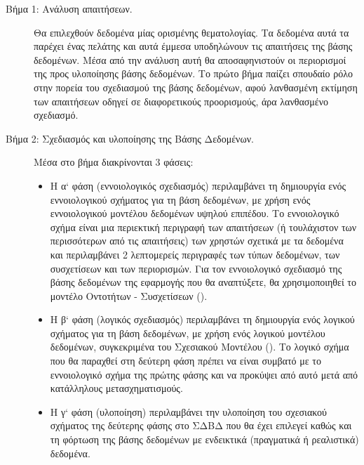 \documentclass{assignment}
\begin{document}
\begin{description}

  \item [Βήμα 1: Ανάλυση απαιτήσεων.]  Θα επιλεχθούν δεδομένα μίας ορισμένης θεματολογίας. Τα δεδομένα αυτά τα παρέχει ένας πελάτης και αυτά έμμεσα υποδηλώνουν τις απαιτήσεις της βάσης δεδομένων. Μέσα από την ανάλυση αυτή θα αποσαφηνιστούν οι περιορισμοί της προς υλοποίησης βάσης δεδομένων. Το πρώτο βήμα παίζει σπουδαίο ρόλο στην πορεία του σχεδιασμού της βάσης δεδομένων, αφού λανθασμένη εκτίμηση των απαιτήσεων οδηγεί σε διαφορετικούς προορισμούς, άρα λανθασμένο σχεδιασμό. 

  \item [Βήμα 2: Σχεδιασμός και υλοποίησης της Βάσης Δεδομένων.] Μέσα στο βήμα διακρίνονται 3 φάσεις:

  \begin{itemize}

    \item Η α` φάση (εννοιολογικός σχεδιασμός) περιλαμβάνει τη δημιουργία ενός εννοιολογικού σχήματος για τη βάση δεδομένων, με χρήση ενός εννοιολογικού μοντέλου δεδομένων υψηλού επιπέδου. Το εννοιολογικό σχήμα είναι μια περιεκτική περιγραφή των απαιτήσεων (ή τουλάχιστον των περισσότερων από τις απαιτήσεις) των χρηστών σχετικά με τα δεδομένα και περιλαμβάνει 2 λεπτομερείς περιγραφές των τύπων δεδομένων, των συσχετίσεων και των περιορισμών. Για τον εννοιολογικό σχεδιασμό της βάσης δεδομένων της εφαρμογής που θα αναπτύξετε, θα χρησιμοποιηθεί το μοντέλο Οντοτήτων - Συσχετίσεων ().

    \item Η β` φάση (λογικός σχεδιασμός) περιλαμβάνει τη δημιουργία ενός λογικού σχήματος για τη βάση δεδομένων, με χρήση ενός λογικού μοντέλου δεδομένων, συγκεκριμένα του Σχεσιακού Μοντέλου (). Το λογικό σχήμα που θα παραχθεί στη δεύτερη φάση πρέπει να είναι συμβατό με το εννοιολογικό σχήμα της πρώτης φάσης και να προκύψει από αυτό μετά από κατάλληλους μετασχηματισμούς.

    \item Η γ` φάση (υλοποίηση) περιλαμβάνει την υλοποίηση του σχεσιακού σχήματος της δεύτερης φάσης στο ΣΔΒΔ που θα έχει επιλεγεί καθώς και τη φόρτωση της βάσης δεδομένων με ενδεικτικά (πραγματικά ή ρεαλιστικά) δεδομένα.

  \end{itemize}

\end{description}
\end{document}

